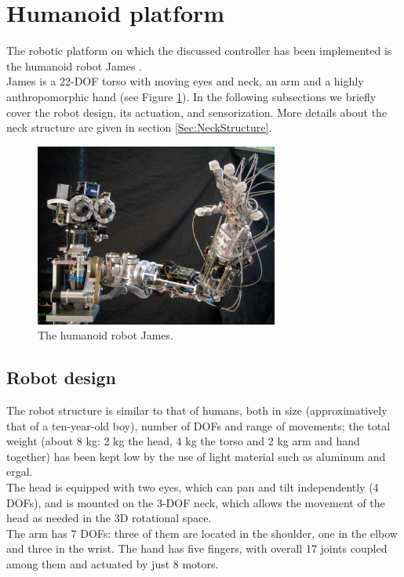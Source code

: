 \documentclass[conference]{IEEEtran}
\numberwithin{equation}{section}
\begin{document}
\section{Humanoid platform} \label{Sec:Platform}

The robotic platform on which the discussed controller has been implemented is the humanoid robot James \cite{James06}.\\James is a 22-DOF torso with moving eyes and neck, an arm and a highly anthropomorphic hand (see Figure \ref{Fig:PicureJames}). In the following subsections we briefly cover the robot design, its actuation, and sensorization. More details about the neck structure are given in section \ref{Sec:NeckStructure}.

\begin{figure}[h!tbp]
\centering
\includegraphics[width=80mm]{image/James1.png}
\caption{The humanoid robot James.}
\label{Fig:PicureJames}
\end{figure}

\subsection{Robot design}

The robot structure is similar to that of humans, both in size (approximatively that of a ten-year-old boy), number of DOFs and range of movements; the total weight (about 8 kg: 2 kg the head, 4 kg the torso and 2 kg arm and hand together) has been kept low by the use of light material such as aluminum and ergal.\\The head is equipped with two eyes, which can pan and tilt independently (4 DOFs), and is mounted on the 3-DOF neck, which allows the movement of the head as needed in the 3D rotational space.\\The arm has 7 DOFs: three of them are located in the shoulder, one in the elbow and three in the wrist. The hand has five fingers, with overall 17 joints coupled among them and actuated by just 8 motors.
\end{document}
